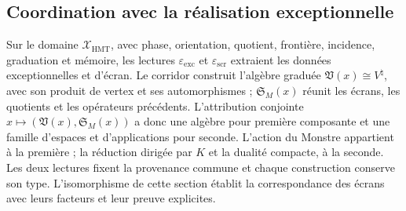 \subsection{Coordination avec la réalisation exceptionnelle}

Sur le domaine \(\mathcal X_{\mathrm{HMT}}\), avec phase, orientation,
quotient, frontière, incidence, graduation et mémoire, les lectures
\(\varepsilon_{\mathrm{exc}}\) et \(\varepsilon_{\mathrm{scr}}\) extraient
les données exceptionnelles et d’écran. Le corridor construit l’algèbre
graduée \(\mathfrak V(x)\cong V^\natural\), avec son produit de vertex
et ses automorphismes ; \(\mathfrak S_M(x)\) réunit les écrans, les quotients
et les opérateurs précédents. L’attribution conjointe
\(x\mapsto(\mathfrak V(x),\mathfrak S_M(x))\) a donc une
algèbre pour première composante et une famille d’espaces et d’applications pour seconde.
L’action du Monstre appartient à la première ; la réduction dirigée par \(K\)
et la dualité compacte, à la seconde. Les deux lectures fixent la provenance
commune et chaque construction conserve son type.
L’isomorphisme de cette section établit la correspondance des
écrans avec leurs facteurs et leur preuve
explicites.
